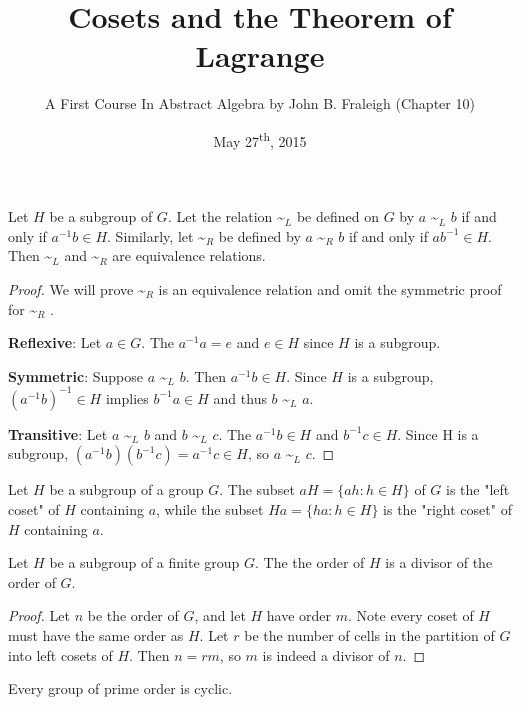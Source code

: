 \documentclass[a4paper,8pt]{article}
\title{Cosets and the Theorem of Lagrange}
\author{A First Course In Abstract Algebra by John B. Fraleigh (Chapter 10)}
\date{May 27\textsuperscript{th}, 2015}
\newcommand{\lowtilde}[1] {
  \textasciitilde{}\(_{#1}\)
}
\begin{document}
\maketitle
{}

\begin{outline}

    Let \(H\) be a subgroup of \(G\). Let the relation\lowtilde{L}be defined on \(G\)
    by \(a\)\lowtilde{L}\(b\) if and only if \(a^{-1}b \in H\). Similarly, let\lowtilde{R}be defined
    by \(a\)\lowtilde{R}\(b\) if and only if \(ab^{-1} \in H\). Then\lowtilde{L}and\lowtilde{R}are
    equivalence relations.

    \begin{proof}
      We will prove\lowtilde{R}is an equivalence relation and omit the symmetric proof for\lowtilde{R}.

      \textbf{Reflexive}: Let \(a \in G\). The \(a^{-1}a = e\) and \(e \in H\) since \(H\) is a subgroup.

      \textbf{Symmetric}: Suppose \(a\)\lowtilde{L}\(b\). Then \(a^{-1}b \in H\). Since \(H\) is a subgroup,
      \((a^{-1}b)^{-1} \in H\) implies \(b^{-1}a \in H\) and thus \(b\)\lowtilde{L}\(a\).

      \textbf{Transitive}: Let \(a\)\lowtilde{L}\(b\) and \(b\)\lowtilde{L}\(c\). The \(a^{-1}b \in H\)
      and \(b^{-1}c \in H\). Since H is a subgroup, \((a^{-1}b)(b^{-1}c) = a^{-1}c \in H\), so
      \(a\)\lowtilde{L}\(c\).
    \end{proof}

    Let \(H\) be a subgroup of a group \(G\). The subset \(aH = \{ah : h \in H\}\) of \(G\)
    is the "left coset" of \(H\) containing \(a\), while the subset \(Ha = \{ha : h \in H\}\) is the "right
    coset" of \(H\) containing \(a\).

    Let \(H\) be a subgroup of a finite group \(G\). The the order of \(H\) is a divisor of the order of \(G\).

    \begin{proof}
      Let \(n\) be the order of \(G\), and let \(H\) have order \(m\). Note every coset of \(H\) must have
      the same order as \(H\). Let \(r\) be the number of cells in the partition of \(G\) into left cosets of
      \(H\). Then \(n = rm\), so \(m\) is indeed a divisor of \(n\).
    \end{proof}

    Every group of prime order is cyclic.


\end{outline}
\end{document}
